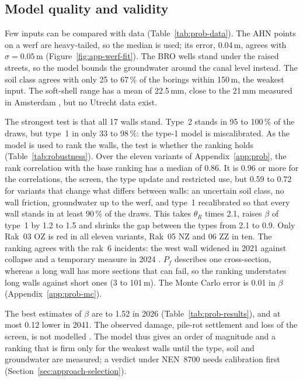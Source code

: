 \subsection{Model quality and validity}\label{sec:prob-validity}

Few inputs can be compared with data (Table~\ref{tab:prob-data}). The AHN
points on a werf are heavy-tailed, so the median is used; its error, 0.04\,m,
agrees with $\sigma = 0.05$\,m (Figure~\ref{fig:app-werf-fit}). The
BRO wells stand under the raised streets, so the model bounds the groundwater
around the canal level instead.
The soil class agrees with only 25 to 67\,\% of the borings within 150\,m, the
weakest input. The soft-shell range has a mean of 22.5\,mm, close to the
21\,mm measured in Amsterdam \parencite{hemel2023}, but no Utrecht data exist.

The strongest test is that all 17 walls stand. Type~2 stands in 95
to 100\,\% of the draws, but type~1 in only 33 to 98\,\%: the type-1 model is
miscalibrated. As the model is used to rank the walls, the test is whether the ranking holds (Table~\ref{tab:robustness}). Over the eleven variants of
Appendix~\ref{app:prob}, the rank correlation with the base ranking
has a median of 0.86. It is 0.96 or more for the correlations, the screen, the
type update and restricted use, but 0.59 to 0.72 for variants that change what
differs between walls: an uncertain soil class, no wall friction, groundwater
up to the werf, and type~1 recalibrated so that every wall stands in at least
90\,\% of the draws. This takes $\theta_R$ times 2.1,
raises $\beta$ of type~1 by 1.2 to 1.5 and shrinks the gap between the types
from 2.1 to 0.9. Only Rak~03 OZ is red in all eleven variants, Rak~05 NZ and
06 ZZ in ten. The ranking agrees with the rak~6 incidents: the west wall
widened in 2021 against collapse and a temporary measure in 2024
\parencite{gu2023vgr,wijkbericht2024walmuur}. $P_f$ describes one
cross-section, whereas a long wall has more sections that can fail, so the
ranking understates long walls against short ones (3 to 101\,m). The Monte Carlo error is 0.01 in $\beta$
(Appendix~\ref{app:prob-mc}).

The best estimates of $\beta$ are  to 1.52 in 2026 (Table~\ref{tab:prob-results}), and at most 0.12 lower in 2041. The
observed damage, pile-rot settlement and loss of the screen, is not modelled
\parencite{erfgoed156}. The model thus gives an order of magnitude and a ranking that is firm only for the weakest walls until the type, soil and groundwater are measured; a verdict under NEN~8700 needs calibration first
(Section~\ref{sec:approach-selection}).

